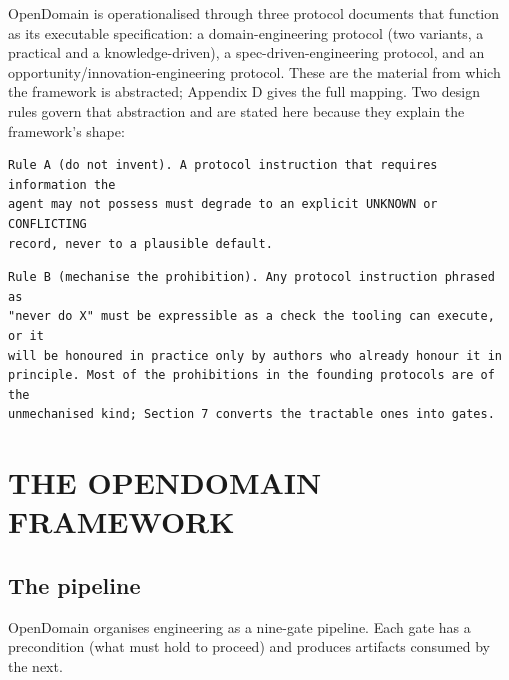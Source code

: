 \documentclass[11pt,a4paper]{article}
\begin{document}
OpenDomain is operationalised through three protocol documents that function as its executable specification: a domain-engineering protocol (two variants, a practical and a knowledge-driven), a spec-driven-engineering protocol, and an opportunity/innovation-engineering protocol. These are the material from which the framework is abstracted; Appendix D gives the full mapping. Two design rules govern that abstraction and are stated here because they explain the framework's shape:

\begin{Verbatim}[fontsize=\footnotesize,breaklines=true,breakanywhere=true,breakautoindent=false,samepage=false]
Rule A (do not invent). A protocol instruction that requires information the
agent may not possess must degrade to an explicit UNKNOWN or CONFLICTING
record, never to a plausible default.
\end{Verbatim}

\begin{Verbatim}[fontsize=\footnotesize,breaklines=true,breakanywhere=true,breakautoindent=false,samepage=false]
Rule B (mechanise the prohibition). Any protocol instruction phrased as
"never do X" must be expressible as a check the tooling can execute, or it
will be honoured in practice only by authors who already honour it in
principle. Most of the prohibitions in the founding protocols are of the
unmechanised kind; Section 7 converts the tractable ones into gates.
\end{Verbatim}

\section{THE OPENDOMAIN FRAMEWORK}

\subsection{The pipeline}

OpenDomain organises engineering as a nine-gate pipeline. Each gate has a precondition (what must hold to proceed) and produces artifacts consumed by the next.
\end{document}
